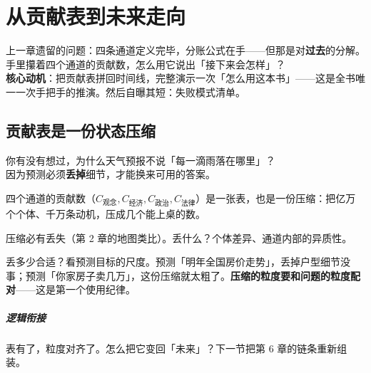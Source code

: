 \documentclass[../../main2.tex]{subfiles}
\begin{document}
\chapter{从贡献表到未来走向}
\label{ch:forecast}

\begin{motivation}
	上一章遗留的问题：四条通道定义完毕，分账公式在手——但那是对\textbf{过去}的分解。手里攥着四个通道的贡献数，怎么用它说出「接下来会怎样」？\\
	\textbf{核心动机}：把贡献表拼回时间线，完整演示一次「怎么用这本书」——这是全书唯一一次手把手的推演。然后自曝其短：失败模式清单。
\end{motivation}

\begin{logicmap}
\end{logicmap}

\section{贡献表是一份状态压缩}

\begin{readingnote}
	你有没有想过，为什么天气预报不说「每一滴雨落在哪里」？\\
	因为预测必须\textbf{丢掉}细节，才能换来可用的答案。
\end{readingnote}

四个通道的贡献数（$C_{\text{观念}}, C_{\text{经济}}, C_{\text{政治}}, C_{\text{法律}}$）是一张表，也是一份压缩：把亿万个个体、千万条动机，压成几个能上桌的数。

压缩必有丢失（第 2 章的地图类比）。丢什么？个体差异、通道内部的异质性。

丢多少合适？看预测目标的尺度。预测「明年全国房价走势」，丢掉户型细节没事；预测「你家房子卖几万」，这份压缩就太粗了。\textbf{压缩的粒度要和问题的粒度配对}——这是第一个使用纪律。

\paragraph*{逻辑衔接}
	表有了，粒度对齐了。怎么把它变回「未来」？下一节把第 6 章的链条重新组装。
\end{document}
